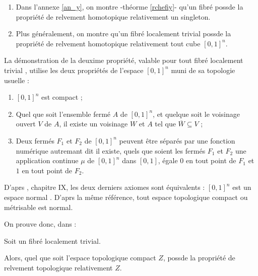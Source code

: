 \begin{exem}
\begin{enumerate}
\item Dans l'annexe \ref{an_y}, on montre -th\'eorme \ref{rchefiy}- qu'un fibr\'e \Fiy %
possde la propri\'et\'e de relvement homotopique relativement  un singleton.
%
\item Plus g\'en\'eralement, on montre \cite{NaberF} qu'un fibr\'e localement trivial \Fiy %
possde la propri\'et\'e de relvement homotopique relativement  tout cube $[0,1]^n$.
\end{enumerate}
\end{exem}

La d\'emonstration de la deuxime propri\'et\'e, valable pour tout fibr\'e localement trivial \Fiy , %
utilise les deux propri\'et\'es de l'espace $[0,1]^n$ muni de sa topologie usuelle :

\begin{enumerate}[label=(A\arabic *)]
\item $[0,1]^n$ est compact ;
\item Quel que soit l'ensemble ferm\'e $A$ de $[0,1]^n$, et quelque soit le voisinage ouvert $V$ de $A$, %
il existe un voisinage $W$ et $A$ tel que $\overline{W}\subseteq V$ ;
\item Deux ferm\'es $F_1$ et $F_2$ de $[0,1]^n$ peuvent \^etre s\'epar\'es par une fonction num\'erique autremant dit il existe, %
quels que soient les ferm\'es $F_1$ et $F_2$ une application continue $\mu$ de $[0,1]^n$ dans $[0,1]$, %
\'egale  $0$ en tout point de $F_1$ et  $1$ en tout point de $F_2$.
\end{enumerate}

D'aprs \cite{BouTG}, chapitre IX, les deux derniers axiomes sont \'equivalents  : \og{} $[0,1]^n$ est un espace normal \fg{}. %
D'aprs la m\^eme r\'ef\'erence, tout espace topologique compact ou m\'etrisable est normal.

\par
On prouve donc, dans \cite{NaberF} :

\begin{theo}
Soit \Fiy un fibr\'e localement trivial.

\par
Alors, quel que soit l'espace topologique compact $Z$, \Fiy possde la propri\'et\'e de relvement topologique relativement  $Z$.
\end{theo}


